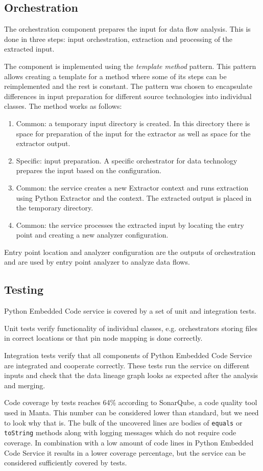 \subsection{Orchestration}
The orchestration component prepares the input for data flow analysis. This is done in three steps: input orchestration, extraction and processing of the extracted input.
\par
The component is implemented using the \textit{template method} pattern. This pattern allows creating a template for a method where some of its steps can be reimplemented and the rest is constant. The pattern was chosen to encapsulate differences in input preparation for different source technologies into individual classes. The method works as follows:
\begin{enumerate}
    \item Common: a temporary input directory is created. In this directory there is space for preparation of the input for the extractor as well as space for the extractor output.
    \item Specific: input preparation. A specific orchestrator for data technology prepares the input based on the configuration.
    \item Common: the service creates a new Extractor context and runs extraction using Python Extractor and the context. The extracted output is placed in the temporary directory.
    \item Common: the service processes the extracted input by locating the entry point and creating a new analyzer configuration.
\end{enumerate}
\par
Entry point location and analyzer configuration are the outputs of orchestration and are used by entry point analyzer to analyze data flows.

\subsection{Testing}

Python Embedded Code service is covered by a set of unit and integration tests.
\par
Unit tests verify functionality of individual classes, e.g. orchestrators storing files in correct locations or that pin node mapping is done correctly.
\par
Integration tests verify that all components of Python Embedded Code Service are integrated and cooperate correctly. These tests run the service on different inputs and check that the data lineage graph looks as expected after the analysis and merging.
\par
Code coverage by tests reaches 64\% according to SonarQube, a code quality tool used in Manta. This number can be considered lower than standard, but we need to look why that is. The bulk of the uncovered lines are bodies of \texttt{equals} or \texttt{toString} methods along with logging messages which do not require code coverage. In combination with a low amount of code lines in Python Embedded Code Service it results in a lower coverage percentage, but the service can be considered sufficiently covered by tests.